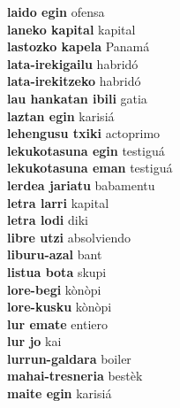 \textbf{ laido egin  } ofensa \\
\textbf{ laneko kapital  } kapital \\
\textbf{ lastozko kapela  } Panamá \\
\textbf{ lata-irekigailu  } habridó \\
\textbf{ lata-irekitzeko  } habridó \\
\textbf{ lau hankatan ibili  } gatia \\
\textbf{ laztan egin  } karisiá \\
\textbf{ lehengusu txiki  } actoprimo \\
\textbf{ lekukotasuna egin  } testiguá \\
\textbf{ lekukotasuna eman  } testiguá \\
\textbf{ lerdea jariatu  } babamentu \\
\textbf{ letra larri  } kapital \\
\textbf{ letra lodi  } diki \\
\textbf{ libre utzi  } absolviendo \\
\textbf{ liburu-azal  } bant \\
\textbf{ listua bota  } skupi \\
\textbf{ lore-begi  } kònòpi \\
\textbf{ lore-kusku  } kònòpi \\
\textbf{ lur emate  } entiero \\
\textbf{ lur jo  } kai \\
\textbf{ lurrun-galdara  } boiler \\
\textbf{ mahai-tresneria  } bestèk \\
\textbf{ maite egin  } karisiá \\
